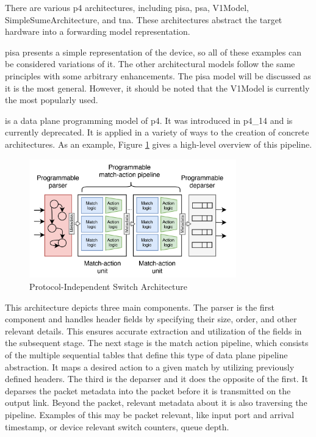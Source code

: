 There are various \gls{p4} architectures, including \gls{pisa}, \gls{psa}, V1Model, SimpleSumeArchitecture, and \gls{tna}\cite{peterson_software-defined_2021}\cite{hauser_survey_2021}. These architectures abstract the target hardware into a forwarding model representation. 

\gls{pisa} presents a simple representation of the device, so all of these examples can be considered variations of it. The other architectural models follow the same principles with some arbitrary enhancements. The \gls{pisa} model will be discussed as it is the most general. However, it should be noted that the V1Model is currently the most popularly used.

 is a data plane programming model of \gls{p4}. It was introduced in \gls{p4}\_14 and is currently deprecated. It is applied in a variety of ways to the creation of concrete architectures\cite{hauser_survey_2021}. As an example, Figure \ref{fig:pisa_pipeline} gives a high-level overview of this pipeline. 

\begin{figure}
	\centering
	\includegraphics[width=0.8\textwidth]{Chapters/Figures/SDNs/pisa_pipeline.png}
	\caption{Protocol-Independent Switch Architecture\cite{hauser_survey_2021}}
	\label{fig:pisa_pipeline}
\end{figure}

This architecture depicts three main components. The parser is the first component and handles header fields by specifying their size, order, and other relevant details. This ensures accurate extraction and utilization of the fields in the subsequent stage. The next stage is the match action pipeline, which consists of the multiple sequential tables that define this type of data plane pipeline abstraction. It maps a desired action to a given match by utilizing previously defined headers. The third is the deparser and it does the opposite of the first. It deparses the packet metadata into the packet before it is transmitted on the output link. Beyond the packet, relevant metadata about it is also traversing the pipeline. Examples of this may be packet relevant, like input port and arrival timestamp, or device relevant switch counters, queue depth. 

